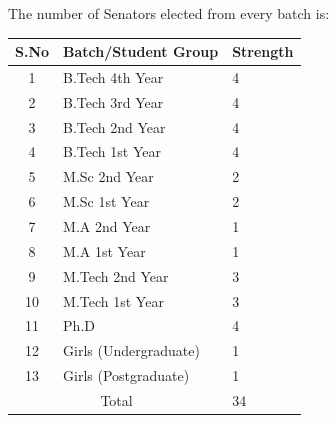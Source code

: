 \documentclass[12pt]{article}
\begin{document}
\noindent The number of Senators elected from every batch is:
\begin{table}[H]
\centering
\begin{tabular}{|c|l|l|}
\hline
\multicolumn{1}{|l|}{\textbf{S.No}} & \textbf{Batch/Student Group} & \textbf{Strength} \\ \hline
1                                   & B.Tech 4th Year              & 4        \\ \hline
2                                   & B.Tech 3rd Year              & 4                 \\ \hline
3                                   & B.Tech 2nd Year              & 4                 \\ \hline
4                                   & B.Tech 1st Year              & 4                 \\ \hline
5                                   & M.Sc 2nd Year                & 2                 \\ \hline
6                                   & M.Sc 1st Year                & 2                 \\ \hline
7                                   & M.A 2nd Year                 & 1                 \\ \hline
8                                   & M.A 1st Year                 & 1                 \\ \hline
9                                   & M.Tech 2nd Year              & 3                 \\ \hline
10                                  & M.Tech 1st Year              & 3                 \\ \hline
11                                  & Ph.D                         & 4                 \\ \hline
12                                  & Girls (Undergraduate)        & 1                 \\ \hline
13                                  & Girls (Postgraduate)         & 1                 \\ \hline
\multicolumn{2}{|c|}{Total}                                        & 34                \\ \hline
\end{tabular}
\end{table}
\end{document}
